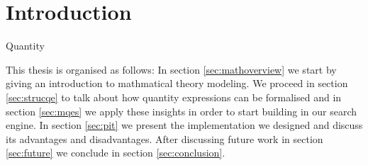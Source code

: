 \section{Introduction}

Quantity





This thesis is organised as follows: In section \ref{sec:mathoverview} we start by giving an introduction to mathmatical theory modeling. We proceed in section \ref{sec:strucqe} to talk about how quantity expressions can be formalised and in section \ref{sec:mqes} we apply these insights in order to start building in our search engine. In section \ref{sec:pit} we present the implementation we designed and discuss its advantages and disadvantages. After discussing future work in section \ref{sec:future} we conclude in section \ref{sec:conclusion}. 
